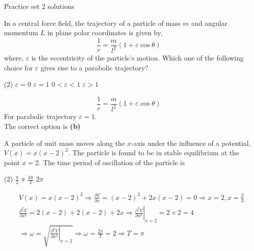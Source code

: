 \newpage
\begin{abox}
	Practice set 2 solutions
	\end{abox}
\begin{enumerate}
\begin{minipage}{\textwidth}
	\item In a central force field, the trajectory of a particle of mass $m$ and angular momentum $L$ in plane polar coordinates is given by,\\
	$$\frac{1}{r}=\frac{m}{l^{2}}(1+\varepsilon \cos \theta)$$
	where, $\varepsilon$ is the eccentricity of the particle's motion. Which one of the following choice for $\varepsilon$ gives rise to a parabolic trajectory?
\end{minipage}
\begin{tasks}(2)
	\task[\textbf{A.}] $\varepsilon=0$
	\task[\textbf{B.}]$\varepsilon=1$
	\task[\textbf{C.}] $0<\varepsilon<1$
	\task[\textbf{D.}] $\varepsilon>1$
\end{tasks}
\begin{answer}
	$$
	\frac{1}{r}=\frac{m}{l^{2}}(1+\varepsilon \cos \theta)
	$$
	For parabolic trajectory $\varepsilon=1$.\\
	The correct option is \textbf{(b)}
\end{answer}
\begin{minipage}{\textwidth}
	\item A particle of unit mass moves along the $x$-axis under the influence of a potential, $V(x)=x(x-2)^{2}$. The particle is found to be in stable equilibrium at the point $x=2$. The time period of oscillation of the particle is
\end{minipage}
\begin{tasks}(2)
	\task[\textbf{A.}] $\frac{\pi}{2}$
	\task[\textbf{B.}]$\pi$
	\task[\textbf{C.}]$\frac{3 \pi}{2}$
	\task[\textbf{D.}] $2 \pi$
\end{tasks}
\begin{answer}
	\begin{align*}
	&V(x)=x(x-2)^{2} \Rightarrow \frac{\partial V}{\partial x}=(x-2)^{2}+2 x(x-2)=0 \Rightarrow x=2, x=\frac{2}{3}\\
		&\frac{\partial^{2} V}{\partial x^{2}}=2(x-2)+2(x-2)+\left.2 x \Rightarrow \frac{\partial^{2} V}{\partial x^{2}}\right|_{x=2}=2 \times 2=4 \\
		&\Rightarrow \omega=\sqrt{\left.\frac{\partial^{2} V}{\partial x^{2}}\right|_{x=2}} \Rightarrow \omega=\frac{2 \pi}{T}=2 \Rightarrow T=\pi
	\end{align*}

\end{answer}
\end{enumerate}
